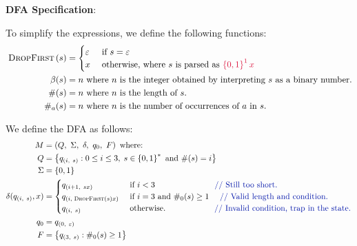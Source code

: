 \begin{Answer}
  \step
  \textbf{DFA Specification}:

  \step
  To simplify the expressions, we define the following functions:
  \begin{align*}
    \shift{s} &= \begin{cases}
      \eps &\text{ if } s = \eps\\
      x &\text{ otherwise, where } s \text{ is parsed as } \crim{\set{0, 1}^1x} \\
    \end{cases} \\
    \beta(s) &= n \text{ where $n$ is the integer obtained by interpreting $s$ as a binary number.} \\
    \#(s) &= n \text{ where $n$ is the length of $s$.} \\
    \#_a(s) &= n \text{ where $n$ is the number of occurrences of $a$ in $s$.}
  \end{align*}

  \step
  We define the DFA as follows:
  \begin{align*}
    M &= \left( Q,\ \Sigma,\ \delta,\ q_0,\ F \right) \text{ where: }\\
    Q &= \set{ q_{(i,\ s)} : 0 \leq i \le 3,\; s \in \set{0, 1}^* \text{ and } \#(s) = i} \\
    \Sigma &= \set{0, 1} \\
    \delta(q_{(i,\ s)}, x) &= \begin{cases}
      q_{(i+1,\ sx)} &\text{ if } i < 3 \quad \quad \quad \quad \quad \quad \quad \zaff{\text{ // Still too short.}}\\
      q_{(i, \shift{s}x)} &\text{ if $i = 3$ and } \#_0(s) \ge 1 \quad \zaff{\text{ // Valid length and condition.}}\\
      q_{(i,\ s)} &\text{ otherwise.} \quad \quad \quad \quad \quad \quad \zaff{\text{// Invalid condition, trap in the state.}}
    \end{cases} \\
    q_0 &= q_{(0,\ \eps)} \\
    F &= \set{ q_{(3,\ s)} : \#_0(s) \ge 1}
  \end{align*}
\end{Answer}
